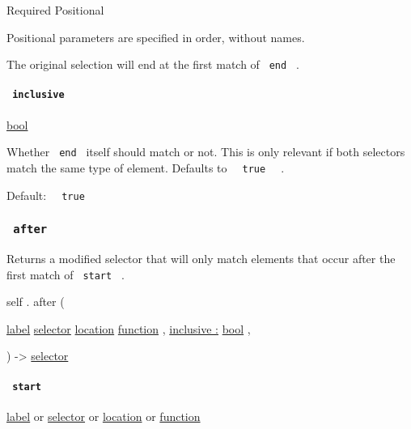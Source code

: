 {Required} {{ Positional }}

\label{definitions-before-end-positional-tooltip}
Positional parameters are specified in order, without names.

The original selection will end at the first match of \texttt{\ end\ } .

\paragraph{\texorpdfstring{\texttt{\ inclusive\ }}{ inclusive }}\label{definitions-before-inclusive}

\href{/docs/reference/foundations/bool/}{bool}

Whether \texttt{\ end\ } itself should match or not. This is only
relevant if both selectors match the same type of element. Defaults to
\texttt{\ }{\texttt{\ true\ }}\texttt{\ } .

Default: \texttt{\ }{\texttt{\ true\ }}\texttt{\ }

\subsubsection{\texorpdfstring{\texttt{\ after\ }}{ after }}\label{definitions-after}

Returns a modified selector that will only match elements that occur
after the first match of \texttt{\ start\ } .

self { . } { after } (

{ \href{/docs/reference/foundations/label/}{label}
\href{/docs/reference/foundations/selector/}{selector}
\href{/docs/reference/introspection/location/}{location}
\href{/docs/reference/foundations/function/}{function} , } {
\hyperref[definitions-after-parameters-inclusive]{inclusive :}
\href{/docs/reference/foundations/bool/}{bool} , }

) -\textgreater{} \href{/docs/reference/foundations/selector/}{selector}

\paragraph{\texorpdfstring{\texttt{\ start\ }}{ start }}\label{definitions-after-start}

\href{/docs/reference/foundations/label/}{label} {or}
\href{/docs/reference/foundations/selector/}{selector} {or}
\href{/docs/reference/introspection/location/}{location} {or}
\href{/docs/reference/foundations/function/}{function}

